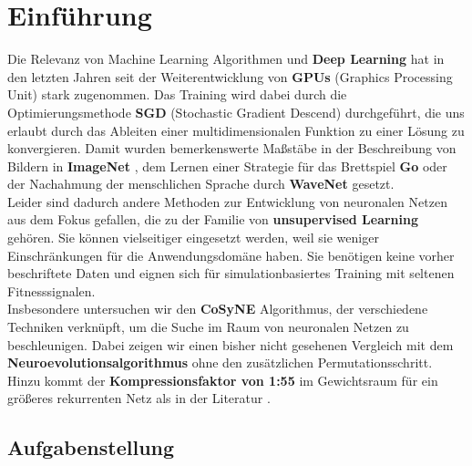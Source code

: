 \chapter{Einführung}


Die Relevanz von Machine Learning Algorithmen und \textbf{Deep Learning} \cite{dloverview} hat in den letzten Jahren seit der Weiterentwicklung von \textbf{GPUs} (Graphics Processing Unit) stark zugenommen. Das Training wird dabei durch die Optimierungsmethode \textbf{SGD} (Stochastic Gradient Descend) durchgeführt, die uns erlaubt durch das Ableiten einer multidimensionalen Funktion zu einer Lösung zu konvergieren. Damit wurden bemerkenswerte Maßstäbe in der Beschreibung von Bildern in \textbf{ImageNet} \cite{NIPS2012_4824}, dem Lernen einer Strategie für das Brettspiel \textbf{Go} \cite{go} oder der Nachahmung der menschlichen Sprache durch \textbf{WaveNet} \cite{wavenet} gesetzt. \\

\noindent
Leider sind dadurch andere Methoden zur Entwicklung von neuronalen Netzen aus dem Fokus gefallen, die zu der Familie von \textbf{unsupervised Learning} gehören. Sie können vielseitiger eingesetzt werden, weil sie weniger Einschränkungen für die Anwendungsdomäne haben. Sie benötigen keine vorher beschriftete Daten und eignen sich für simulationbasiertes Training mit seltenen Fitnesssignalen.\\

\noindent
Insbesondere untersuchen wir den \textbf{CoSyNE} Algorithmus, der verschiedene Techniken verknüpft, um die Suche im Raum von neuronalen Netzen zu beschleunigen. Dabei zeigen wir einen bisher nicht gesehenen Vergleich mit dem \textbf{Neuroevolutionsalgorithmus} ohne den zusätzlichen Permutationsschritt. Hinzu kommt der \textbf{Kompressionsfaktor von 1:55} im Gewichtsraum für ein größeres rekurrenten Netz als in der Literatur \cite{cosyne1}.

\section{Aufgabenstellung}

